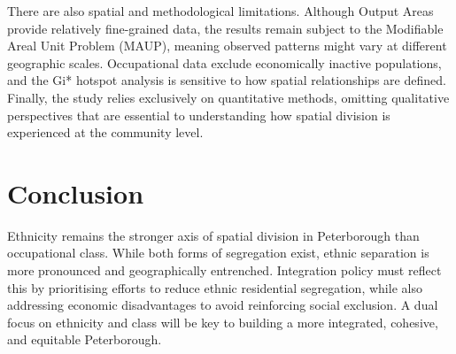 \documentclass[10pt]{article}
\begin{document}
\begin{multicols}{2}
	\indent There are also spatial and methodological limitations. Although Output Areas provide relatively fine-grained data, the results remain subject to the Modifiable Areal Unit Problem (MAUP), meaning observed patterns might vary at different geographic scales. Occupational data exclude economically inactive populations, and the Gi* hotspot analysis is sensitive to how spatial relationships are defined. Finally, the study relies exclusively on quantitative methods, omitting qualitative perspectives that are essential to understanding how spatial division is experienced at the community level.
	
	\vspace{-1em}
	
	\section*{Conclusion}
	\indent Ethnicity remains the stronger axis of spatial division in Peterborough than occupational class. While both forms of segregation exist, ethnic separation is more pronounced and geographically entrenched. Integration policy must reflect this by prioritising efforts to reduce ethnic residential segregation, while also addressing economic disadvantages to avoid reinforcing social exclusion. A dual focus on ethnicity and class will be key to building a more integrated, cohesive, and equitable Peterborough.
	
	\end{multicols}
\end{document}
